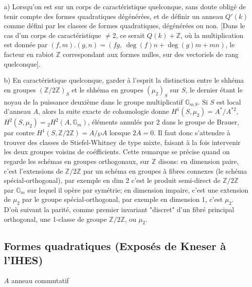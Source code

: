 \documentclass[11pt,a4paper]{article}
\begin{document}
a) Lorsqu'on est sur un corps de caractéristique 
quelconque, sans doute obligé de tenir compte des formes quadratiques
dégénérées, et de définir un anneau $Q'(k)$ comme défini par les classes
de formes quadratiques, dégénérées ou non. [Dans le cas d'un corps de
caractéristique $\neq 2$, ce serait $Q(k) + \mathbb{Z}$, où la
multiplication est donnée par $(f, m).(g, n) = (fg,\ \deg(f) n + \deg(g) m
+ mn)$, le facteur en rabiot $\mathbb{Z}$ correspondant aux formes nulles,
sur des vectoriels de rang quelconque].

b) En caractéristique quelconque, garder à l'esprit la distinction entre
le shhéma en groupes $(\mathbb{Z}/2\mathbb{Z})_S$ et le shhéma en groupes
$(\mu_2)_S$ sur $S$, le dernier étant le noyau de la puissance deuxième
dans le groupe multiplicatif $\mathbb{G}_{m\,S}$. Si $S$ est local
d'anneau $A$, alors la suite exacte de cohomologie donne $H^1(S, \mu_2) =
A^{*}/A^{*2}$, $H^2(S, \mu_2) = {}_2H^2(A, \mathbb{G}_m)$, éléments annulés
par 2 dans le groupe de Brauer, par contre $H^1(S, \mathbb{Z}/2\mathbb{Z}) =
A/\wp A$ lorsque $2A = 0$. Il faut donc s'attendre à trouver des classes de
Stiefel-Whitney de type mixte, faisant à la fois intervenir les deux
groupes voisins de coéfficients. Cette remarque se précise quand on
regarde les schémas en groupes orthogonaux, sur $\mathbb{Z}$ disons: en
dimension paire, c'est l'extensions de $\mathbb{Z}/2\mathbb{Z}$ par un
schéma en groupes à fibres connexes (le schéma spécial-orthogonal), par
exemple en dim 2 c'est le produit semi-direct de $\mathbb{Z}/2\mathbb{Z}$
par $\mathbb{G}_m$ sur lequel il opère par symétrie; en dimension impaire,
c'est une extension de $\mu_2$ par le groupe spécial-orthogonal, par
exemple en dimension 1, c'est $\mu_2$. D'où suivant la parité, comme
premier invariant "discret" d'un fibré principal orthogonal, une 1-classe
de groupe $\mathbb{Z}/2\mathbb{Z}$, ou $\mu_2$.

\subsection*{Formes quadratiques (Exposés de Kneser à l'IHES)}



$A$ anneau commutatif
\end{document}
